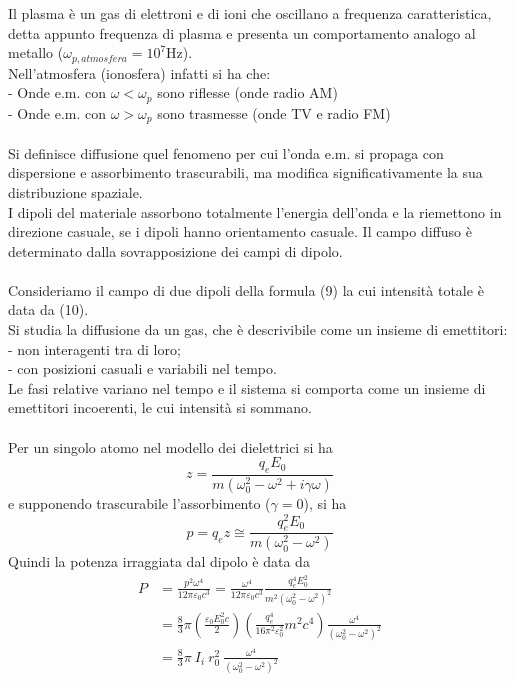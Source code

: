 \documentclass{article}
\begin{document}
Il plasma è un gas di elettroni e di ioni che oscillano a frequenza caratteristica, detta appunto frequenza di plasma e presenta un comportamento analogo al metallo ($\omega_{p,atmosfera}=10^7$Hz).\\
Nell’atmosfera (ionosfera) infatti si ha che:\\
- Onde e.m. con $\omega<\omega_p$ sono riflesse (onde radio AM)\\
- Onde e.m. con $\omega>\omega_p$ sono trasmesse (onde TV e radio FM)\\
\\
Si definisce diffusione quel fenomeno per cui l'onda e.m. si propaga con dispersione e assorbimento trascurabili, ma modifica significativamente la sua distribuzione spaziale.\\
I dipoli del materiale assorbono totalmente l'energia dell'onda e la riemettono in direzione casuale, se i dipoli hanno orientamento casuale. Il campo diffuso è determinato dalla sovrapposizione dei campi di dipolo.\\
\\
Consideriamo il campo di due dipoli della formula (9) la cui intensità totale è data da (10).\\
Si studia la diffusione da un gas, che è descrivibile come un insieme di emettitori:\\
- non interagenti tra di loro;\\
- con posizioni casuali e variabili nel tempo.\\
Le fasi relative variano nel tempo e il sistema si comporta come un insieme di emettitori incoerenti, le cui intensità si sommano.\\
\\
Per un singolo atomo nel modello dei dielettrici si ha
\begin{equation}
    z=\frac{q_eE_0}{m(\omega_0^2-\omega^2+i\gamma\omega)}
\nonumber
\end{equation}
e supponendo trascurabile l'assorbimento ($\gamma= 0$), si ha
\begin{equation}
    p=q_ez\cong\frac{q_e^2E_0}{m(\omega_0^2-\omega^2)}
\nonumber
\end{equation}
Quindi la potenza irraggiata dal dipolo è data da
\begin{equation}
\begin{split}
    P&=\frac{p^2\omega^4}{12\pi\varepsilon_0c^3}=\frac{\omega^4}{12\pi\varepsilon_0c^3}\frac{q_e^4E_0^2}{m^2(\omega_0^2-\omega^2)^2}\\
    &=\frac{8}{3}\pi\left(\frac{\varepsilon_0E_0^2c}{2}\right) \left(\frac{q_e^4}{16\pi^2\varepsilon_0^2}m^2c^4\right) \frac{\omega^4}{(\omega_0^2-\omega^2)^2}\\
    &=\frac{8}{3}\pi\ I_i\ r_0^2\ \frac{\omega^4}{(\omega_0^2-\omega^2)^2}
    \nonumber
\end{split}
\end{equation}
\end{document}

